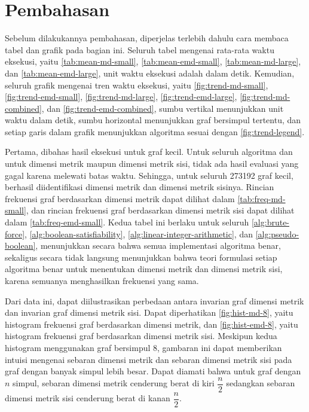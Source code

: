 \section{Pembahasan}
\label{sec:discussion}

Sebelum dilakukannya pembahasan, diperjelas terlebih dahulu cara membaca tabel dan grafik pada bagian ini. Seluruh tabel mengenai rata-rata waktu eksekusi, yaitu \autoref{tab:mean-md-small}, \autoref{tab:mean-emd-small}, \autoref{tab:mean-md-large}, dan \autoref{tab:mean-emd-large}, unit waktu eksekusi adalah dalam detik. Kemudian, seluruh grafik mengenai tren waktu eksekusi, yaitu \autoref{fig:trend-md-small}, \autoref{fig:trend-emd-small}, \autoref{fig:trend-md-large}, \autoref{fig:trend-emd-large}, \autoref{fig:trend-md-combined}, dan \autoref{fig:trend-emd-combined}, sumbu vertikal menunjukkan unit waktu dalam detik, sumbu horizontal menunjukkan graf bersimpul tertentu, dan setiap garis dalam grafik menunjukkan algoritma sesuai dengan \autoref{fig:trend-legend}.

\begin{center}
	\renewcommand{\minipagewidth}{\linewidth}
	
\end{center}

Pertama, dibahas hasil eksekusi untuk graf kecil. Untuk seluruh algoritma dan untuk dimensi metrik maupun dimensi metrik sisi, tidak ada hasil evaluasi yang gagal karena melewati batas waktu. Sehingga, untuk seluruh 273192 graf kecil, berhasil diidentifikasi dimensi metrik dan dimensi metrik sisinya. Rincian frekuensi graf berdasarkan dimensi metrik dapat dilihat dalam \autoref{tab:freq-md-small}, dan rincian frekuensi graf berdasarkan dimensi metrik sisi dapat dilihat dalam \autoref{tab:freq-emd-small}. Kedua tabel ini berlaku untuk seluruh \autoref{alg:brute-force}, \autoref{alg:boolean-satisfiability}, \autoref{alg:linear-integer-arithmetic}, dan \autoref{alg:pseudo-boolean}, menunjukkan secara  bahwa semua implementasi algoritma benar, sekaligus secara tidak langsung menunjukkan bahwa teori formulasi setiap algoritma benar untuk menentukan dimensi metrik dan dimensi metrik sisi, karena semuanya menghasilkan frekuensi yang sama.

Dari data ini, dapat diilustrasikan perbedaan antara invarian graf dimensi metrik dan invarian graf dimensi metrik sisi. Dapat diperhatikan \autoref{fig:hist-md-8}, yaitu histogram frekuensi graf berdasarkan dimensi metrik, dan \autoref{fig:hist-emd-8}, yaitu histogram frekuensi graf berdasarkan dimensi metrik sisi. Meskipun kedua histogram menggunakan graf bersimpul 8, gambaran ini dapat memberikan intuisi mengenai sebaran dimensi metrik dan sebaran dimensi metrik sisi pada graf dengan banyak simpul lebih besar. Dapat diamati bahwa untuk graf dengan \(n\) simpul, sebaran dimensi metrik cenderung berat di kiri \(\dfrac{n}{2}\) sedangkan sebaran dimensi metrik sisi cenderung berat di kanan \(\dfrac{n}{2}\).

